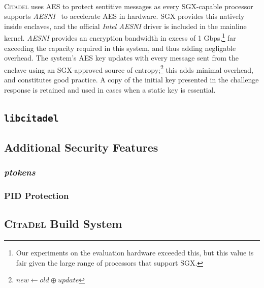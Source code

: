 \paragraph{} \textsc{Citadel} uses AES to protect sentitive messages as every SGX-capable processor supports \textit{AESNI}~\cite{aesni} to accelerate AES in hardware. SGX provides this natively inside enclaves, and the official \textit{Intel AESNI} driver is included in the mainline kernel. \textit{AESNI} provides an encryption bandwidth in excess of 1 Gbps,\footnote{Our experiments on the evaluation hardware exceeded this, but this value is fair given the large range of processors that support SGX.} far exceeding the capacity required in this system, and thus adding negligable overhead. The system's AES key updates with every message sent from the enclave using an SGX-approved source of entropy;\footnote{$new \leftarrow old \oplus update$} this adds minimal overhead, and constitutes good practice. A copy of the initial key presented in the challenge response is retained and used in cases when a static key is essential.

\subsection{\texttt{libcitadel}}
\label{sec:libcitadel}

\subsection{Additional Security Features}

\subsubsection{\textit{ptokens}}
\label{sec:ptokens}

\subsubsection{PID Protection}

\subsection{\textsc{Citadel} Build System}
\label{sec:build-system}
